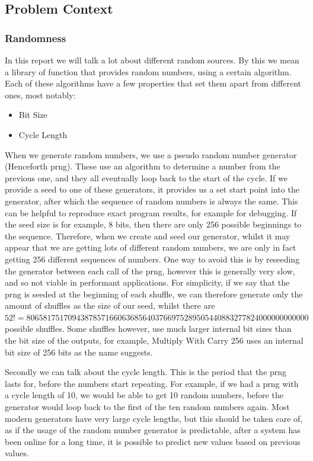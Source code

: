 \subsection{Problem Context}

\subsubsection{Randomness}
In this report we will talk a lot about different random sources. By this we
mean a library of function that provides random numbers, using a certain
algorithm. Each of these algorithms have a few properties that set them apart
from different ones, most notably:

\begin{itemize}
\item Bit Size
\item Cycle Length
\end{itemize}

When we generate random numbers, we use a pseudo random number generator
(Henceforth prng). These
use an algorithm to determine a number from the previous one, and they all
eventually loop back to the start of the cycle. If we provide a seed to one
of these generators, it provides us a set start point into the generator, after
which the sequence of random numbers is always the same. This can be helpful
to reproduce exact program results, for example for debugging. If the seed
size is for example, 8 bits, then there are only 256 possible beginnings to
the sequence. Therefore, when we create and seed our generator, whilst it may
appear that we are getting lots of different random numbers, we are only
in fact getting 256 different sequences of numbers. One way to avoid this is
by reseeding the generator between each call of the prng, however this is
generally very slow, and so not viable in performant applications. For
simplicity, if we say that the prng is seeded at the beginning of each shuffle,
we can therefore generate only the amount of shuffles as the size of our seed,
whilst there are
$52! = 80658175170943878571660636856403766975289505440883277824000000000000$
possible shuffles. Some shuffles however, use much larger internal bit sizes than
the bit size of the outputs, for example, Multiply With Carry 256 \parencite{marsaglia2003}
uses an internal bit size of 256 bits as the name suggests.

Secondly we can talk about the cycle length. This is the period that the prng
lasts for, before the numbers start repeating. For example, if we had a prng
with a cycle length of 10, we would be able to get 10 random numbers, before
the generator would loop back to the first of the ten random numbers again.
Most modern generators have very large cycle lengths, but this should be taken
care of, as if the usage of the random number generator is predictable, after
a system has been online for a long time, it is possible to predict new values
based on previous values.

